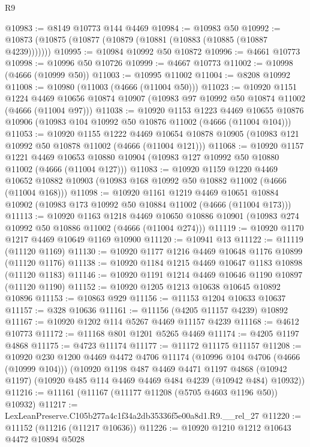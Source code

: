 \begin{lexlean}{R9}
\begin{coremodule}
@10983 := @8149 @10773 @144 @4469
@10984 := @10983 @50
@10992 := @10873 (@10875 (@10877 (@10879 (@10881 (@10883 (@10885 (@10887 @4239)))))))
@10995 := @10984 @10992 @50 @10872
@10996 := @4661 @10773
@10998 := @10996 @50 @10726
@10999 := @4667 @10773
@11002 := @10998 (@4666 (@10999 @50))
@11003 := @10995 @11002
@11004 := @8208 @10992
@11008 := @10980 (@11003 (@4666 (@11004 @50)))
@11023 := @10920
    @1151
    @1224
    @4469
    @10656
    @10874
    @10907
    (@10983 @97 @10992 @50 @10874 @11002 (@4666 (@11004 @97)))
@11038 := @10920
    @1153
    @1223
    @4469
    @10655
    @10876
    @10906
    (@10983 @104 @10992 @50 @10876 @11002 (@4666 (@11004 @104)))
@11053 := @10920
    @1155
    @1222
    @4469
    @10654
    @10878
    @10905
    (@10983 @121 @10992 @50 @10878 @11002 (@4666 (@11004 @121)))
@11068 := @10920
    @1157
    @1221
    @4469
    @10653
    @10880
    @10904
    (@10983 @127 @10992 @50 @10880 @11002 (@4666 (@11004 @127)))
@11083 := @10920
    @1159
    @1220
    @4469
    @10652
    @10882
    @10903
    (@10983 @168 @10992 @50 @10882 @11002 (@4666 (@11004 @168)))
@11098 := @10920
    @1161
    @1219
    @4469
    @10651
    @10884
    @10902
    (@10983 @173 @10992 @50 @10884 @11002 (@4666 (@11004 @173)))
@11113 := @10920
    @1163
    @1218
    @4469
    @10650
    @10886
    @10901
    (@10983 @274 @10992 @50 @10886 @11002 (@4666 (@11004 @274)))
@11119 := @10920 @1170 @1217 @4469 @10649 @1169 @10900
@11120 := @10941 @13
@11122 := @11119 (@11120 @1169)
@11130 := @10920 @1177 @1216 @4469 @10648 @1176 @10899 (@11120 @1176)
@11138 := @10920 @1184 @1215 @4469 @10647 @1183 @10898 (@11120 @1183)
@11146 := @10920 @1191 @1214 @4469 @10646 @1190 @10897 (@11120 @1190)
@11152 := @10920 @1205 @1213 @10638 @10645 @10892 @10896
@11153 := @10863 @929
@11156 := @11153 @1204 @10633 @10637
@11157 := @328 @10636
@11161 := @11156 (@4205 @11157 @4239) @10892
@11167 := @10920 @1202 @114 @5267 @4469 @11157 @4239
@11168 := @4612 @10773
@11172 := @11168 @801 @1201 @5265 @4469
@11174 := @4205 @1197 @4868
@11175 := @4723 @11174
@11177 := @11172 @11175 @11157
@11208 := @10920
    @230
    @1200
    @4469
    @4472
    @4706
    @11174
    (@10996 @104 @4706 (@4666 (@10999 @104)))
    (@10920
      @1198
      @487
      @4469
      @4471
      @1197
      @4868
      (@10942 @1197)
      (@10920 @485 @114 @4469 @4469 @484 @4239 (@10942 @484) @10932))
@11216 := @11161 (@11167 (@11177 @11208 (@5705 @4603 @1196 @50)) @10932)
@11217 := LexLeanPreserve.C105b277a4c1f34a2db35336f5e00a8d1.R9.__rel_27
@11220 := @11152 (@11216 (@11217 @10636))
@11226 := @10920 @1210 @1212 @10643 @4472 @10894 @5028

\end{coremodule}
\end{lexlean}
